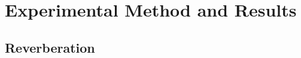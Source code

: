 \documentclass[paper=a4, fontsize=10pt, font=arial]{scrartcl} %
\numberwithin{equation}{section} %
\numberwithin{figure}{section} %
\numberwithin{table}{section} %
\begin{document}
\newpage
\section{Experimental Method and Results}
\subsection{Reverberation}




\end{document}
